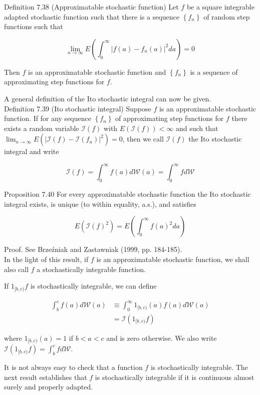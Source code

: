 \documentclass[10pt]{article}
\begin{document}
Definition 7.38 (Approximatable stochastic function) Let $f$ be a square integrable adapted stochastic function such that there is a sequence $\left\{f_{n}\right\}$ of random step functions such that

$$
\lim _{n \rightarrow \infty} E\left(\int_{0}^{\infty}\left|f(a)-f_{n}(a)\right|^{2} d a\right)=0
$$

Then $f$ is an approximatable stochastic function and $\left\{f_{n}\right\}$ is a sequence of approximating step functions for $f$.

A general definition of the Ito stochastic integral can now be given.\\
Definition 7.39 (Ito stochastic integral) Suppose $f$ is an approximatable stochastic function. If for any sequence $\left\{f_{n}\right\}$ of approximating step functions for $f$ there exists a random variable $\mathcal{I}(f)$ with $E(\mathcal{I}(f))<\infty$ and such that $\lim _{n \rightarrow \infty} E\left(\left|\mathcal{I}(f)-\mathcal{I}\left(f_{n}\right)\right|^{2}\right)=0$, then we call $\mathcal{I}(f)$ the Ito stochastic integral and write

$$
\mathcal{I}(f)=\int_{0}^{\infty} f(a) d \mathcal{W}(a)=\int_{0}^{\infty} f d \mathcal{W}
$$

Proposition 7.40 For every approximatable stochastic function the Ito stochastic integral exists, is unique (to within equality, a.s.), and satisfies

$$
E\left(\mathcal{I}(f)^{2}\right)=E\left(\int_{0}^{\infty} f(a)^{2} d a\right)
$$

Proof. See Brzeźniak and Zastawniak (1999, pp. 184-185).\\
In the light of this result, if $f$ is an approximatable stochastic function, we shall also call $f$ a stochastically integrable function.

If $1_{[b, c)} f$ is stochastically integrable, we can define

$$
\begin{aligned}
\int_{b}^{c} f(a) d \mathcal{W}(a) & \equiv \int_{0}^{\infty} 1_{[b, c)}(a) f(a) d \mathcal{W}(a) \\
& =\mathcal{I}\left(1_{[b, c)} f\right)
\end{aligned}
$$

where $1_{[b, c)}(a)=1$ if $b<a<c$ and is zero otherwise. We also write $\mathcal{I}\left(1_{[b, c)} f\right)=\int_{b}^{c} f d \mathcal{W}$.

It is not always easy to check that a function $f$ is stochastically integrable. The next result establishes that $f$ is stochastically integrable if it is continuous almost surely and properly adapted.
\end{document}
